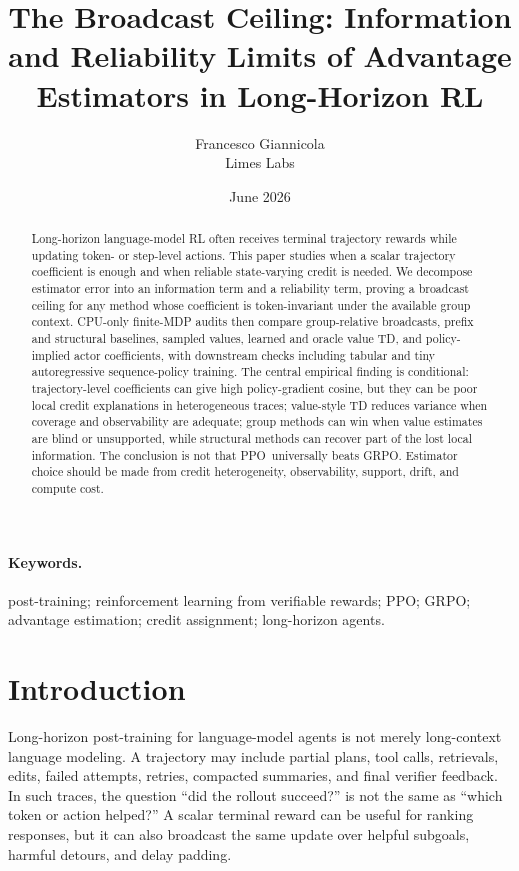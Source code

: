 \documentclass[11pt]{article}
\title{\vspace{-1.0cm}The Broadcast Ceiling: Information and Reliability Limits of Advantage Estimators in Long-Horizon RL}
\author{Francesco Giannicola\\Limes Labs}
\date{June 2026}
\newcommand{\grpo}{\textsc{GRPO}}
\newcommand{\ppo}{\textsc{PPO}}
\begin{document}
\maketitle

\begin{abstract}
Long-horizon language-model RL often receives terminal trajectory rewards while
updating token- or step-level actions. This paper studies when a scalar
trajectory coefficient is enough and when reliable state-varying credit is
needed. We decompose estimator error into an information term and a reliability
term, proving a broadcast ceiling for any method whose coefficient is
token-invariant under the available group context. CPU-only finite-MDP audits
then compare group-relative broadcasts, prefix and structural baselines,
sampled values, learned and oracle value TD, and policy-implied actor
coefficients, with downstream checks including tabular and tiny autoregressive
sequence-policy training. The central empirical finding is conditional:
trajectory-level coefficients can give high policy-gradient cosine, but they
can be poor local credit explanations in heterogeneous traces; value-style TD
reduces variance when coverage and observability are adequate; group methods
can win when value estimates are blind or unsupported, while structural methods
can recover part of the lost local information. The conclusion is not that
\ppo\ universally beats \grpo. Estimator choice should be made from credit
heterogeneity, observability, support, drift, and compute cost.
\end{abstract}

\paragraph{Keywords.}
post-training; reinforcement learning from verifiable rewards; PPO; GRPO;
advantage estimation; credit assignment; long-horizon agents.

\section{Introduction}

Long-horizon post-training for language-model agents is not merely long-context
language modeling. A trajectory may include partial plans, tool calls,
retrievals, edits, failed attempts, retries, compacted summaries, and final
verifier feedback. In such traces, the question ``did the rollout succeed?''
is not the same as ``which token or action helped?'' A scalar terminal reward
can be useful for ranking responses, but it can also broadcast the same update
over helpful subgoals, harmful detours, and delay padding.
\end{document}
